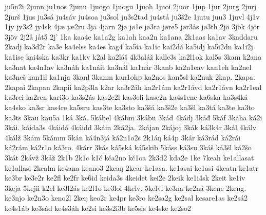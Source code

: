 {    ju5n2i
    2junn
    ju1nos
    2junu
    1juogo
    1juogu
    1juoh
    1juoi
    2juor
    1jup
    1jur
    2jurg
    2jurj
    2jurš
    1jus
    ju3sá
    ju4sáv
    ju4soa
    ju3sol
    ju3s2tad
    ju4stá
    ju3š2e
    1jutu
    juu3
    1juvl
    4j1v
    1jy
    jy3s2
    jy4sk
    4jæ
    jæ2ru
    3jä
    4järn
    2jø
    jø1e
    jø3ra
    jøre5
    jør3ås
    jø3th
    2jö
    3jök
    4jör
    3jöv
    2j2å
    jåt5
    2j'
    1ka
    kaa4e
    ka1a2g
    ka1ah
    kaa2n
    ka1ana
    2k1aas
    ka1av
    3kaddaru
    2kadj
    ka3d2r
    ka3e
    ka4elss
    ka4es
    kag4
    ka5ia
    ka1ic
    kai2dá
    ka5idj
    ka5i2dn
    ka1i2j
    ka1ise
    kai4ska
    ka3kr
    ka1kv
    k2al
    ka2láš
    4k3aláž
    kalle3s
    ka2l1ok
    kal5s
    3kam
    k2ana
    ka3nat
    ka4n1av
    ka3náh
    ka1náit
    ka3nál
    ka1nár
    3kanb
    ka2n1eav
    kan1eh
    ka2nel
    ka3neš
    kan1il
    ka1nja
    3kanl
    3kanm
    kan1ohp
    ka2nos
    kan5sl
    ka2nuk
    2kap.
    2kapa.
    2kapai
    2kapan
    2kapii
    ka2p3la
    k2ar
    ka3r2áh
    ka2r1ám
    ka2r1ávd
    ka2r1ávn
    ka2r1eal
    ka3rei
    ka2ren
    kari3o
    ka3s2ás
    kas2e2l
    kas3eli
    kase2n
    ka4s1ene
    ka6ska
    ka3s4ká
    ka4sko
    ka3sr
    kas4re
    ka5sru
    kas3te
    ka3sto
    ka3šá
    ka3š2e
    ka3šl
    ka3tá
    ka3te
    ka3to
    ka3ts
    3kau
    kau5a
    1ká
    3ká.
    5kábel
    4kábm
    3kábu
    3kád
    4kádj
    3káđ
    5káf
    3káha
    ká2i
    3kái.
    káida3s
    4káidá
    4káidd
    3káin
    2ká2ja.
    2kájan
    2kájoj
    3kák
    ká3k4r
    3kál
    4kálv
    4kálž
    3kám
    5kámm
    5kán
    ká4n3já
    ká2n1o2s
    2k1áŋ
    ká4p
    3kár
    ká3rád
    ká2rái
    ká2rám
    ká2r1o
    ká3ro.
    4kárr
    3kás
    ká5ská
    ká5skib
    5káss
    ká3su
    3káš
    ká3šl
    ká2šo
    3kát
    2kávž
    3káž
    2k1b
    2k1c
    k1č
    kča2no
    kč1oa
    2k3d2
    kda2e
    1ke
    7keah
    ke1allasat
    ke1allasi
    2kealm
    ke4ana
    keano3
    2keaŋ
    2kear
    ke1asa.
    ke1asai
    ke1asi
    4keatn
    ke1atr
    ke3br
    ke3e2r
    ke2fl
    ke2fr
    ke6id
    keida3s
    4keidet
    kei2e
    2keik
    ke1i4sk
    2keit
    ke1iv
    3keja
    5kejii
    k2el
    ke3l2ás
    ke2l1o
    ke3loi
    4kelv.
    5kelvl
    ke3na
    ke2ná
    3kene
    2keng.
    ke3njo
    ke2n3o
    keno2l
    2keŋ
    keo2r
    ke4pr
    ke3ro
    ke2sa2g
    ke2sal
    kesare1as
    ke2sá2
    ke4s1áb
    ke3sád
    ke4s3áh
    ke2si
    ke3s2i3b
    ke5sis
    ke4ske
    ke2so2
}
